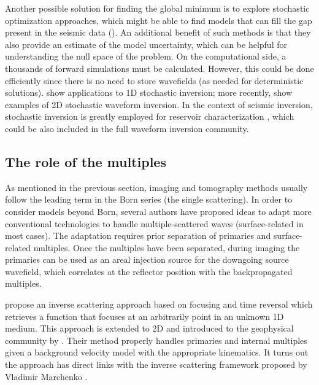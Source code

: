 Another possible solution for finding the global minimum is to explore 
stochastic optimization approaches, which might be able to  
 find models that can fill the gap present in the seismic data (). An additional benefit
of such methods is that they also provide an estimate of the model uncertainty,
which can be helpful for understanding
the null space of the problem. On the computational side, a thousands of forward simulations
must be calculated. However, this could be done efficiently since 
there is no need to store wavefields (as needed for deterministic 
solutions). \cite{Sen91} show applications to 
1D stochastic inversion; more recently, \cite{stochasticPisa,SenWorkshop} show examples
of 2D stochastic waveform inversion. In the context of seismic inversion, stochastic inversion
is greatly employed for reservoir characterization \citep{boschReview}, which could 
be also included in the full waveform inversion community. 

\subsection{The role of the multiples}
As mentioned in the previous section, imaging and tomography methods usually follow
the leading term in the Born series (the single scattering). In order
to consider models beyond Born, 
several authors \citep{GuittonAreal,grion2007mirror,VerschuurMultiples,DanWhitmore,Mandy} have 
proposed ideas to adapt more conventional technologies 
to handle multiple-scattered waves (surface-related in most cases).
 The adaptation requires prior separation of primaries and surface-related multiples. 
Once the multiples have been separated, during imaging the primaries can be 
used as an areal injection source for the downgoing source wavefield, which 
correlates at the reflector position with the backpropagated multiples.

\cite{rose2002,rose2002single} propose an inverse scattering approach based
on focusing and time reversal which retrieves a function  that focuses at 
an arbitrarily point in an 
unknown 1D medium. This approach is extended to 2D and introduced to 
the geophysical community by \cite{Fil2012}. Their method properly handles
primaries and internal multiples given a background velocity model with the 
appropriate kinematics. It turns out the approach has direct links with 
the inverse scattering framework proposed by Vladimir Marchenko \citep{marchenko2011sturm}. 

